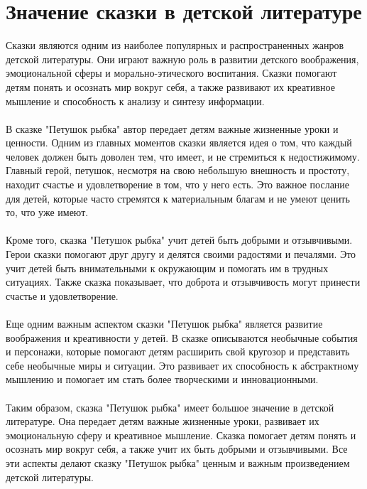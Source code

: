 \documentclass{article}
\begin{document}
\section{Значение сказки в детской литературе}
Сказки являются одним из наиболее популярных и распространенных жанров детской литературы. Они играют важную роль в развитии детского воображения, эмоциональной сферы и морально-этического воспитания. Сказки помогают детям понять и осознать мир вокруг себя, а также развивают их креативное мышление и способность к анализу и синтезу информации.\\
~\\
В сказке "{}Петушок рыбка"{} автор передает детям важные жизненные уроки и ценности. Одним из главных моментов сказки является идея о том, что каждый человек должен быть доволен тем, что имеет, и не стремиться к недостижимому. Главный герой, петушок, несмотря на свою небольшую внешность и простоту, находит счастье и удовлетворение в том, что у него есть. Это важное послание для детей, которые часто стремятся к материальным благам и не умеют ценить то, что уже имеют.\\
~\\
Кроме того, сказка "{}Петушок рыбка"{} учит детей быть добрыми и отзывчивыми. Герои сказки помогают друг другу и делятся своими радостями и печалями. Это учит детей быть внимательными к окружающим и помогать им в трудных ситуациях. Также сказка показывает, что доброта и отзывчивость могут принести счастье и удовлетворение.\\
~\\
Еще одним важным аспектом сказки "{}Петушок рыбка"{} является развитие воображения и креативности у детей. В сказке описываются необычные события и персонажи, которые помогают детям расширить свой кругозор и представить себе необычные миры и ситуации. Это развивает их способность к абстрактному мышлению и помогает им стать более творческими и инновационными.\\
~\\
Таким образом, сказка "{}Петушок рыбка"{} имеет большое значение в детской литературе. Она передает детям важные жизненные уроки, развивает их эмоциональную сферу и креативное мышление. Сказка помогает детям понять и осознать мир вокруг себя, а также учит их быть добрыми и отзывчивыми. Все эти аспекты делают сказку "{}Петушок рыбка"{} ценным и важным произведением детской литературы.
\end{document}
